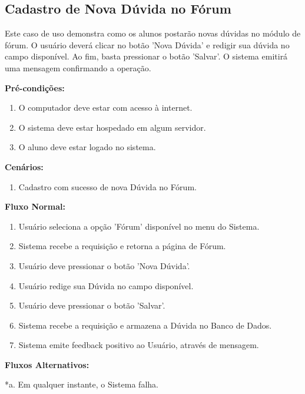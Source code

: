 \documentclass[graduacao,brazil]{ThesisPUC}
\begin{document}
\subsection{Cadastro de Nova D\'{u}vida no F\'{o}rum}

Este caso de uso demonstra como os alunos postar\~{a}o novas d\'{u}vidas no m\'{o}dulo de f\'{o}rum.
O usu\'{a}rio dever\'{a} clicar no bot\~{a}o 'Nova D\'{u}vida' e redigir sua d\'{u}vida no campo dispon\'{i}vel.
Ao fim, basta pressionar o bot\~{a}o 'Salvar'. O sistema emitir\'{a} uma mensagem confirmando a opera\c{c}\~{a}o. 

\textbf{Pr\'{e}-condi\c{c}\~{o}es:}

\begin{enumerate}
  \item O computador deve estar com acesso \`{a} internet.
  \item O sistema deve estar hospedado em algum servidor.
  \item O aluno deve estar logado no sistema.
\end{enumerate}

\textbf{Cen\'{a}rios:}

\begin{enumerate}
  \item Cadastro com sucesso de nova D\'{u}vida no F\'{o}rum.
\end{enumerate}

\textbf{Fluxo Normal:}

\begin{enumerate}
  \item Usu\'{a}rio seleciona a op\c{c}\~{a}o 'F\'{o}rum' dispon\'{i}vel no menu do Sistema.
  \item Sistema recebe a requisi\c{c}\~{a}o e retorna a p\'{a}gina de F\'{o}rum.
  \item Usu\'{a}rio deve pressionar o bot\~{a}o 'Nova D\'{u}vida'.
  \item Usu\'{a}rio redige sua D\'{u}vida no campo dispon\'{i}vel.
  \item Usu\'{a}rio deve pressionar o bot\~{a}o 'Salvar'.
  \item Sistema recebe a requisi\c{c}\~{a}o e armazena a D\'{u}vida no Banco de Dados.
  \item Sistema emite feedback positivo ao Usu\'{a}rio, atrav\'{e}s de mensagem.
\end{enumerate}


\textbf{Fluxos Alternativos:}

*a. Em qualquer instante, o Sistema falha.
\end{document}
